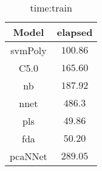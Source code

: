 \begin{table}[!ht]
	\centering
	\begin{tabular}{|c|c|}
		\hline
		Model & elapsed \\ \hline
		svmPoly & $100.86$ \\ \hline
		C5.0 & $165.60$ \\ \hline
		nb & $187.92$ \\ \hline
		nnet & $486.3$ \\ \hline
		pls & $49.86$ \\ \hline
		fda & $50.20$ \\ \hline
		pcaNNet & $289.05$ \\ \hline
	\end{tabular}
	\caption{time:train}
	\label{tab:time:train}
\end{table}
